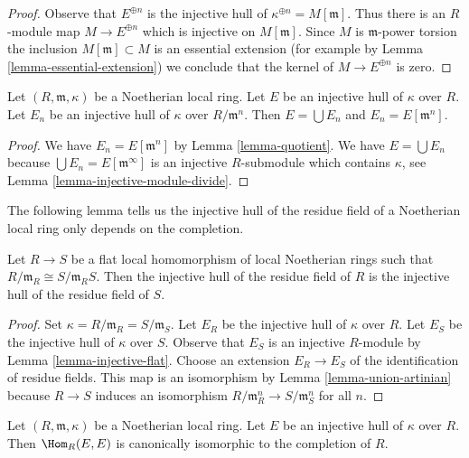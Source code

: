 \begin{proof}
Observe that $E^{\oplus n}$ is the injective hull of
$\kappa^{\oplus n} = M[\mathfrak m]$. Thus there is an $R$-module map
$M \to E^{\oplus n}$ which is injective on $M[\mathfrak m]$.
Since $M$ is $\mathfrak m$-power torsion the inclusion
$M[\mathfrak m] \subset M$ is an essential extension
(for example by Lemma \ref{lemma-essential-extension})
we conclude that the kernel of $M \to E^{\oplus n}$ is zero.
\end{proof}

\begin{lemma}
\label{lemma-union-artinian}
Let $(R, \mathfrak m, \kappa)$ be a Noetherian local ring.
Let $E$ be an injective hull of $\kappa$ over $R$.
Let $E_n$ be an injective hull of $\kappa$ over $R/\mathfrak m^n$.
Then $E = \bigcup E_n$ and $E_n = E[\mathfrak m^n]$.
\end{lemma}

\begin{proof}
We have $E_n = E[\mathfrak m^n]$ by Lemma \ref{lemma-quotient}.
We have $E = \bigcup E_n$ because $\bigcup E_n = E[\mathfrak m^\infty]$
is an injective $R$-submodule which contains $\kappa$, see
Lemma \ref{lemma-injective-module-divide}.
\end{proof}

\noindent
The following lemma tells us the injective hull of the residue
field of a Noetherian local ring only depends on the completion.

\begin{lemma}
\label{lemma-compare}
Let $R \to S$ be a flat local homomorphism of local Noetherian rings
such that $R/\mathfrak m_R \cong S/\mathfrak m_R S$.
Then the injective hull of the residue field
of $R$ is the injective hull of the residue field of $S$.
\end{lemma}

\begin{proof}
Set $\kappa = R/\mathfrak m_R = S/\mathfrak m_S$.
Let $E_R$ be the injective hull of $\kappa$ over $R$.
Let $E_S$ be the injective hull of $\kappa$ over $S$.
Observe that $E_S$ is an injective $R$-module by
Lemma \ref{lemma-injective-flat}.
Choose an extension $E_R \to E_S$ of the identification of
residue fields. This map is an isomorphism by
Lemma \ref{lemma-union-artinian}
because $R \to S$ induces an isomorphism
$R/\mathfrak m_R^n \to S/\mathfrak m_S^n$ for all $n$.
\end{proof}

\begin{lemma}
\label{lemma-endos}
Let $(R, \mathfrak m, \kappa)$ be a Noetherian local ring.
Let $E$ be an injective hull of $\kappa$ over $R$. Then
$\Hom_R(E, E)$ is canonically isomorphic to the completion of $R$.
\end{lemma}

